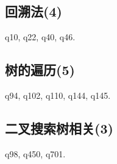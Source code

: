 \subsection{回溯法(4)}

q10,
q22,
q40,
q46.

\subsection{树的遍历(5)}

q94,
q102,
q110,
q144,
q145.

\subsection{二叉搜索树相关(3)}

q98,
q450,
q701.

